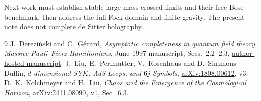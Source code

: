 \documentclass[11pt,a4paper]{article}
\begin{document}
Next work must establish stable large-mass crossed limits and their
free Bose benchmark, then address the full Fock domain and finite
gravity. The present note does not complete de Sitter holography.

\begin{thebibliography}{9}
 J.~Derezi\'nski and C.~G\'erard,
\emph{Asymptotic completeness in quantum field theory.
Massive Pauli--Fierz Hamiltonians}, June 1997 manuscript,
Secs.~2.2--2.3,
\href{https://www.imo.universite-paris-saclay.fr/~christian.gerard/publis/pauli-f.pdf}{author-hosted manuscript}.
 J.~Liu, E.~Perlmutter, V.~Rosenhaus and D.~Simmons-Duffin,
\emph{$d$-dimensional SYK, AdS Loops, and $6j$ Symbols},
\href{https://arxiv.org/abs/1808.00612}{arXiv:1808.00612}, v3.
 D.~K.~Kolchmeyer and H.~Liu,
\emph{Chaos and the Emergence of the Cosmological Horizon},
\href{https://arxiv.org/abs/2411.08090}{arXiv:2411.08090}, v1,
Sec.~6.3.
\end{thebibliography}
\end{document}
